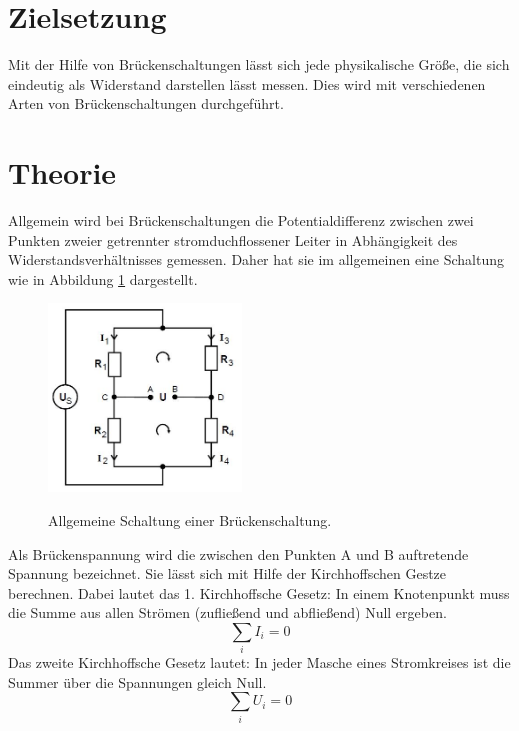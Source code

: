 \section{Zielsetzung}
Mit der Hilfe von Brückenschaltungen lässt sich jede physikalische Größe, die sich
eindeutig als Widerstand darstellen lässt messen.
Dies wird mit verschiedenen Arten von Brückenschaltungen durchgeführt.

\section{Theorie}
Allgemein wird bei Brückenschaltungen die Potentialdifferenz zwischen zwei
Punkten zweier getrennter stromduchflossener Leiter in Abhängigkeit des
Widerstandsverhältnisses gemessen. Daher hat sie im allgemeinen eine Schaltung wie in
Abbildung \ref{fig:allg} dargestellt.
\begin{figure}[H]
  \centering
  \includegraphics[height=5cm]{allg.JPG}
  \caption{Allgemeine Schaltung einer Brückenschaltung.}
  \label{fig:allg}
  \cite{skript}
\end{figure}
Als Brückenspannung wird die zwischen den Punkten A und B auftretende Spannung
bezeichnet. Sie lässt sich mit Hilfe der Kirchhoffschen Gestze berechnen.
Dabei lautet das 1. Kirchhoffsche Gesetz: In einem Knotenpunkt muss die
Summe aus allen Strömen (zufließend und abfließend) Null ergeben.
\begin{equation}
  \sum_{i} I_{i} = 0
  \label{eqn:kirch1}
\end{equation}
Das zweite Kirchhoffsche Gesetz lautet: In jeder Masche eines Stromkreises
ist die Summer über die Spannungen gleich Null.
\begin{equation}
  \sum_{i} U_{i} =0
  \label{eqn:kirch2}
\end{equation}

